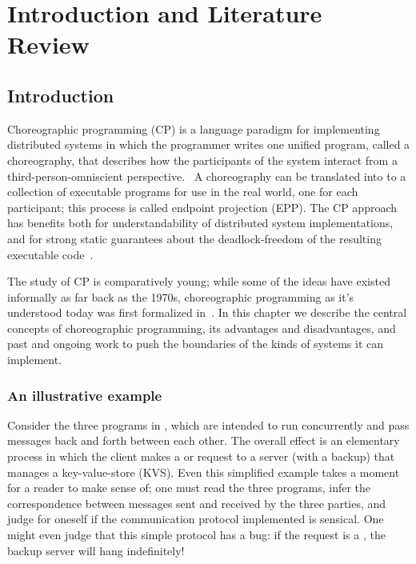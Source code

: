 \chapter{Introduction and Literature Review}

\section{Introduction}
\label{sec:introduction}

Choreographic programming (CP)
is a language paradigm for implementing distributed systems in which the programmer writes one unified program, called a choreography,
that describes how the participants of the system interact
from a third-person-omniscient perspective.~
A choreography can be translated into to a collection of executable programs for use in the real world, one for each participant;
this process is called endpoint projection (EPP).
The CP approach has benefits both for understandability of distributed system implementations,
and for strong static guarantees about the deadlock-freedom of the resulting executable code~\cite{montesi-carbone-dfbd}.

The study of CP is comparatively young; while some of the ideas have existed informally as far back as the 1970s,
choreographic programming as it's understood today was first formalized in~.
In this chapter we describe the central concepts of choreographic programming,
its advantages and disadvantages,
and past and ongoing work to push the boundaries of the kinds of systems it can implement.

\subsection{An illustrative example}

Consider the three programs in ,
which are intended to run concurrently and pass messages back and forth between each other.
The overall effect is an elementary process in which the client makes a  or  request to
a server (with a backup) that manages a key-value-store (KVS).
Even this simplified example takes a moment for a reader to make sense of;
one must read the three programs, infer the correspondence between messages sent and received by the three parties,
and judge for oneself if the communication protocol implemented is sensical.
One might even judge that this simple protocol has a bug:
if the request is a , the backup server will hang indefinitely!

